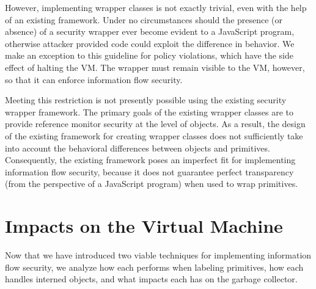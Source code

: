 \documentclass[11pt,onecolumn]{article}
\begin{document}
However, implementing wrapper classes is not exactly trivial, even with the help of an existing framework.
Under no circumstances should the presence (or absence) of a security wrapper ever become evident to a JavaScript program, otherwise attacker provided code could exploit the difference in behavior.
We make an exception to this guideline for policy violations, which have the side effect of halting the VM.
The wrapper must remain visible to the VM, however, so that it can enforce information flow security.

Meeting this restriction is not presently possible using the existing security wrapper framework.
The primary goals of the existing wrapper classes are to provide reference monitor security at the level of objects.
As a result, the design of the existing framework for creating wrapper classes does not sufficiently take into account the behavioral differences between objects and primitives.
Consequently, the existing framework poses an imperfect fit for implementing information flow security, because it does not guarantee perfect transparency (from the perspective of a JavaScript program) when used to wrap primitives.


\section{Impacts on the Virtual Machine}\label{sec:analysis}

Now that we have introduced two viable techniques for implementing information flow security, we analyze how each performs when labeling primitives, how each handles interned objects, and what impacts each has on the garbage collector.
\end{document}
